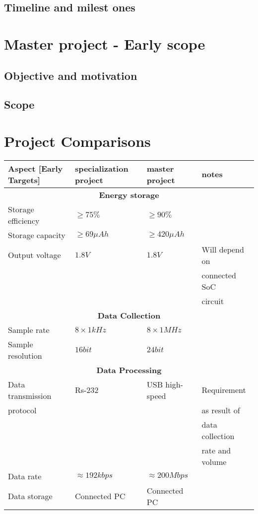 \documentclass[a4paper, 12pt]{report}
\begin{document}
\section{Timeline and milest ones}   %


\chapter{Master project - Early scope}

\section{Objective and motivation} %
\section{Scope}                %

\chapter{Project Comparisons}
\begin{table}[h!]
    \begin{tabular}{|l|l|l|l|}
        \hline
        \textbf{Aspect [Early Targets]} & \textbf{specialization project} & \textbf{master project} & \textbf{notes} \\
        \hline
        \multicolumn{4}{|c|}{\textbf{Energy storage}} \\
        \hline
        Storage efficiency & $\geq 75\%$ &  $\geq 90\%$ & \\
        \hline
        Storage capacity & $\geq 69 \mu Ah$ & $\geq  420 \mu Ah$ & \\
        \hline
        Output voltage & $ 1.8 V$ & $ 1.8 V$ & Will depend on\\
        &&& connected SoC\\
        &&& circuit \\
        \hline
        \multicolumn{4}{|c|}{\textbf{Data Collection}} \\
        \hline
        Sample rate & $8\times 1 kHz$ & $8\times 1 MHz$ & \\
        \hline
        Sample resolution & $16 bit$ & $24 bit$ & \\
        \hline
        \multicolumn{4}{|c|}{\textbf{Data Processing}} \\
        \hline
        Data transmission & Rs-232 & USB high-speed & Requirement \\
        protocol &&& as result of\\
        &&& data collection \\
        &&& rate and volume\\
        \hline
        Data rate & $  \approx 192 kbps$ & $\approx 200 Mbps$ & \\
        \hline
        Data storage & Connected PC & Connected PC & \\
        \hline
    \end{tabular}
\end{table}
\end{document}
